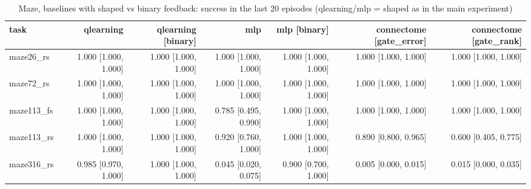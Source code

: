 \begin{table}[t]
\centering
\small
\begin{tabular}{lrrrrrr}
\toprule
task & qlearning & qlearning [binary] & mlp & mlp [binary] & connectome [gate\_error] & connectome [gate\_rank] \\
\midrule
maze26\_rs & 1.000 [1.000, 1.000] & 1.000 [1.000, 1.000] & 1.000 [1.000, 1.000] & 1.000 [1.000, 1.000] & 1.000 [1.000, 1.000] & 1.000 [1.000, 1.000] \\
maze72\_rs & 1.000 [1.000, 1.000] & 1.000 [1.000, 1.000] & 1.000 [1.000, 1.000] & 1.000 [1.000, 1.000] & 1.000 [1.000, 1.000] & 1.000 [1.000, 1.000] \\
maze113\_fs & 1.000 [1.000, 1.000] & 1.000 [1.000, 1.000] & 0.785 [0.495, 0.990] & 1.000 [1.000, 1.000] & 1.000 [1.000, 1.000] & 1.000 [1.000, 1.000] \\
maze113\_rs & 1.000 [1.000, 1.000] & 1.000 [1.000, 1.000] & 0.920 [0.760, 1.000] & 1.000 [1.000, 1.000] & 0.890 [0.800, 0.965] & 0.600 [0.405, 0.775] \\
maze316\_rs & 0.985 [0.970, 1.000] & 1.000 [1.000, 1.000] & 0.045 [0.020, 0.075] & 0.900 [0.700, 1.000] & 0.005 [0.000, 0.015] & 0.015 [0.000, 0.035] \\
\bottomrule
\end{tabular}
\caption{Maze, baselines with shaped vs binary feedback: success in the last 20 episodes (qlearning/mlp = shaped as in the main experiment)}
\label{tab:gridworld_binary_final20}
\end{table}